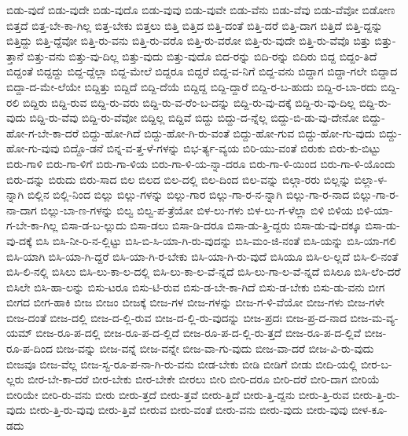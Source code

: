 {ಬಿಡು-ವುದೆ
ಬಿಡು-ವುದೇ
ಬಿಡು-ವುದೊ
ಬಿಡು-ವುವು
ಬಿಡು-ವುವೇ
ಬಿಡು-ವೆನು
ಬಿಡು-ವೆವು
ಬಿಡು-ವೆವೋ
ಬಿಡೋಣ
ಬಿತ್ತದೆ
ಬಿತ್ತ-ಬೇ-ಕಾ-ಗಿಲ್ಲ
ಬಿತ್ತ-ಬೇಕು
ಬಿತ್ತಲು
ಬಿತ್ತಿ
ಬಿತ್ತಿದ
ಬಿತ್ತಿ-ದಂತೆ
ಬಿತ್ತಿ-ದರೆ
ಬಿತ್ತಿ-ದಾಗ
ಬಿತ್ತಿದೆ
ಬಿತ್ತಿ-ದ್ದನ್ನು
ಬಿತ್ತಿದ್ದು
ಬಿತ್ತಿ-ದ್ದೆವೋ
ಬಿತ್ತಿ-ರು-ವನು
ಬಿತ್ತಿ-ರು-ವರೊ
ಬಿತ್ತಿ-ರು-ವರೋ
ಬಿತ್ತಿ-ರು-ವುದೇ
ಬಿತ್ತಿ-ರು-ವೆವೊ
ಬಿತ್ತು
ಬಿತ್ತು-ತ್ತಾನೆ
ಬಿತ್ತು-ವನು
ಬಿತ್ತು-ವು-ದಿಲ್ಲ
ಬಿತ್ತು-ವುದು
ಬಿತ್ತು-ವುದೊ
ಬಿದ-ರನ್ನು
ಬಿದಿ-ರನ್ನು
ಬಿದಿರು
ಬಿದ್ದ
ಬಿದ್ದಂ-ತಿದೆ
ಬಿದ್ದಂತೆ
ಬಿದ್ದದ್ದು
ಬಿದ್ದ-ದ್ದೆಲ್ಲಾ
ಬಿದ್ದ-ಮೇಲೆ
ಬಿದ್ದರೂ
ಬಿದ್ದರೆ
ಬಿದ್ದ-ವ-ನಿಗೆ
ಬಿದ್ದ-ವನು
ಬಿದ್ದಾಗ
ಬಿದ್ದಾ-ಗಲೇ
ಬಿದ್ದಾದ
ಬಿದ್ದಾ-ದ-ಮೇ-ಲೆಯೇ
ಬಿದ್ದಿತ್ತು
ಬಿದ್ದಿದೆ
ಬಿದ್ದಿ-ದೆಯೆ
ಬಿದ್ದಿದ್ದ
ಬಿದ್ದಿ-ದ್ದಾರೆ
ಬಿದ್ದಿ-ರ-ಬ-ಹುದು
ಬಿದ್ದಿ-ರ-ಬಾ-ರದು
ಬಿದ್ದಿ-ರಲಿ
ಬಿದ್ದಿರು
ಬಿದ್ದಿ-ರುವ
ಬಿದ್ದಿ-ರು-ವರು
ಬಿದ್ದಿ-ರು-ವ-ರೆಂ-ಬ-ದನ್ನು
ಬಿದ್ದಿ-ರು-ವು-ದಕ್ಕೆ
ಬಿದ್ದಿ-ರು-ವು-ದಿಲ್ಲ
ಬಿದ್ದಿ-ರು-ವುದು
ಬಿದ್ದಿ-ರು-ವೆವು
ಬಿದ್ದಿ-ರು-ವೆವೋ
ಬಿದ್ದಿಲ್ಲ
ಬಿದ್ದಿವೆ
ಬಿದ್ದು
ಬಿದ್ದು-ದ-ನ್ನೆಲ್ಲ
ಬಿದ್ದು-ಬಿ-ಡು-ವು-ದೇನೋ
ಬಿದ್ದು-ಹೋ-ಗ-ಬೇ-ಕಾ-ದರೆ
ಬಿದ್ದು-ಹೋ-ಗಿದೆ
ಬಿದ್ದು-ಹೋ-ಗಿ-ರು-ವಂತೆ
ಬಿದ್ದು-ಹೋ-ಗುವ
ಬಿದ್ದು-ಹೋ-ಗು-ವುದು
ಬಿದ್ದು-ಹೋ-ಗು-ವುವು
ಬಿದ್ದೊ-ಡನೆ
ಬಿನ್ನ-ವ-ತ್ತ-ಳೆ-ಗಳನ್ನು
ಬಿಭ-ರ್ತ್ಯ-ವ್ಯಯ
ಬಿರಿ-ಯು-ವಂತೆ
ಬಿರುಕು
ಬಿರು-ಕು-ಬಿಟ್ಟು
ಬಿರು-ಗಾಳಿ
ಬಿರು-ಗಾ-ಳಿಗೆ
ಬಿರು-ಗಾ-ಳಿಯ
ಬಿರು-ಗಾ-ಳಿ-ಯ-ನ್ನಾ-ದರೂ
ಬಿರು-ಗಾ-ಳಿ-ಯಿಂದ
ಬಿರು-ಗಾ-ಳಿ-ಯೊಂದು
ಬಿರು-ದನ್ನು
ಬಿರುದು
ಬಿರು-ಸಾದ
ಬಿಲ
ಬಿಲದ
ಬಿಲ-ದಲ್ಲಿ
ಬಿಲ-ದಿಂದ
ಬಿಲ-ವನ್ನು
ಬಿಲ್ಗಾ-ರರು
ಬಿಲ್ಲನ್ನು
ಬಿಲ್ಲಾ-ಳ-ನ್ನಾಗಿ
ಬಿಲ್ಲಿನ
ಬಿಲ್ಲಿ-ನಿಂದ
ಬಿಲ್ಲು
ಬಿಲ್ಲು-ಗಳನ್ನು
ಬಿಲ್ಲು-ಗಾರ
ಬಿಲ್ಲು-ಗಾ-ರ-ನ-ನ್ನಾಗಿ
ಬಿಲ್ಲು-ಗಾ-ರ-ನಾದ
ಬಿಲ್ಲು-ಗಾ-ರ-ನಾ-ದಾಗ
ಬಿಲ್ಲು-ಬಾ-ಣ-ಗಳನ್ನು
ಬಿಲ್ವ
ಬಿಲ್ವ-ಪ-ತ್ರೆಯೋ
ಬಿಳ-ಲು-ಗಳು
ಬಿಳ-ಲು-ಗ-ಳೆಲ್ಲಾ
ಬಿಳಿ
ಬಿಳಿಯ
ಬಿಳಿ-ಯಾ-ಗ-ಬೇ-ಕಾ-ಗಿಲ್ಲ
ಬಿಸಾ-ಡ-ಬ-ಲ್ಲುದು
ಬಿಸಾ-ಡಲು
ಬಿಸಾ-ಡಿ-ದರೂ
ಬಿಸಾ-ಡು-ತ್ತಿ-ದ್ದರು
ಬಿಸಾ-ಡು-ವು-ದಕ್ಕೂ
ಬಿಸಾ-ಡು-ವು-ದಕ್ಕೆ
ಬಿಸಿ
ಬಿಸಿ-ನೀ-ರಿ-ನ-ಲ್ಲಿಟ್ಟು
ಬಿಸಿ-ಬಿ-ಸಿ-ಯಾ-ಗಿ-ರು-ವುದನ್ನು
ಬಿಸಿ-ಮಂ-ಜಿ-ನಂತೆ
ಬಿಸಿ-ಯನ್ನು
ಬಿಸಿ-ಯಾ-ಗಲಿ
ಬಿಸಿ-ಯಾಗಿ
ಬಿಸಿ-ಯಾ-ಗಿ-ದ್ದರೆ
ಬಿಸಿ-ಯಾ-ಗಿ-ರ-ಬೇಕು
ಬಿಸಿ-ಯಾ-ಗಿ-ರು-ವುದೆ
ಬಿಸಿಯೂ
ಬಿಸಿ-ಲ-ಲ್ಲದೆ
ಬಿಸಿ-ಲಿ-ನಂತೆ
ಬಿಸಿ-ಲಿ-ನಲ್ಲಿ
ಬಿಸಿಲು
ಬಿಸಿ-ಲು-ಕಾ-ಲ-ದಲ್ಲಿ
ಬಿಸಿ-ಲು-ಕಾ-ಲ-ವೆ-ನ್ನದೆ
ಬಿಸಿ-ಲು-ಗಾ-ಲ-ವೆ-ನ್ನದೆ
ಬಿಸಿಲೂ
ಬಿಸಿ-ಲೆಂ-ದರೆ
ಬಿಸಿಲೇ
ಬಿಸಿ-ಹಾ-ಲನ್ನು
ಬಿಸು-ಟರೂ
ಬಿಸು-ಟಿ-ರುವ
ಬಿಸು-ಡ-ಬೇ-ಕಾ-ಗಿದೆ
ಬಿಸು-ಡ-ಬೇಕು
ಬಿಸು-ಡು-ವನು
ಬೀಗ
ಬೀಗದ
ಬೀಗ-ಹಾಕಿ
ಬೀಜ
ಬೀಜಂ
ಬೀಜಕ್ಕೆ
ಬೀಜ-ಗಳ
ಬೀಜ-ಗಳನ್ನು
ಬೀಜ-ಗ-ಳಿ-ವೆಯೋ
ಬೀಜ-ಗಳು
ಬೀಜ-ಗಳೇ
ಬೀಜ-ದಂತೆ
ಬೀಜ-ದಲ್ಲಿ
ಬೀಜ-ದ-ಲ್ಲಿ-ರುವ
ಬೀಜ-ದ-ಲ್ಲಿ-ರು-ವುದನ್ನು
ಬೀಜ-ಪ್ರದಃ
ಬೀಜ-ಪ್ರ-ದ-ನಾದ
ಬೀಜ-ಮ-ವ್ಯ-ಯಮ್
ಬೀಜ-ರೂ-ಪ-ದಲ್ಲಿ
ಬೀಜ-ರೂ-ಪ-ದ-ಲ್ಲಿದೆ
ಬೀಜ-ರೂ-ಪ-ದ-ಲ್ಲಿ-ರು-ತ್ತದೆ
ಬೀಜ-ರೂ-ಪ-ದ-ಲ್ಲಿವೆ
ಬೀಜ-ರೂ-ಪ-ದಿಂದ
ಬೀಜ-ವನ್ನು
ಬೀಜ-ವನ್ನೆ
ಬೀಜ-ವನ್ನೇ
ಬೀಜ-ವಾ-ಗು-ವುದು
ಬೀಜ-ವಾ-ದರೆ
ಬೀಜ-ವಿ-ರು-ವುದು
ಬೀಜವೂ
ಬೀಜ-ವೆಲ್ಲ
ಬೀಜ-ಸ್ವ-ರೂ-ಪ-ನಾ-ಗಿ-ರು-ವನು
ಬೀಡ-ಬೇಕು
ಬೀಡಿ
ಬೀಡಿಗೆ
ಬೀಡು
ಬೀದಿ-ಯಲ್ಲಿ
ಬೀರ-ಬ-ಲ್ಲರು
ಬೀರ-ಬೇ-ಕಾ-ದರೆ
ಬೀರ-ಬೇಕು
ಬೀರ-ಬೇಕೇ
ಬೀರಲು
ಬೀರಿ
ಬೀರಿ-ದರೂ
ಬೀರಿ-ದರೆ
ಬೀರಿ-ದಾಗ
ಬೀರಿಯೆ
ಬೀರಿಯೇ
ಬೀರಿ-ರು-ವನು
ಬೀರು
ಬೀರು-ತ್ತದೆ
ಬೀರು-ತ್ತವೆ
ಬೀರು-ತ್ತಿದೆ
ಬೀರು-ತ್ತಿ-ದ್ದನು
ಬೀರು-ತ್ತಿ-ರುವ
ಬೀರು-ತ್ತಿ-ರು-ವುದು
ಬೀರು-ತ್ತಿ-ರು-ವುವು
ಬೀರು-ತ್ತಿವೆ
ಬೀರುವ
ಬೀರು-ವಂತೆ
ಬೀರು-ವನು
ಬೀರು-ವುದು
ಬೀರು-ವುವು
ಬೀಳ-ಕೂ-ಡದು
}

